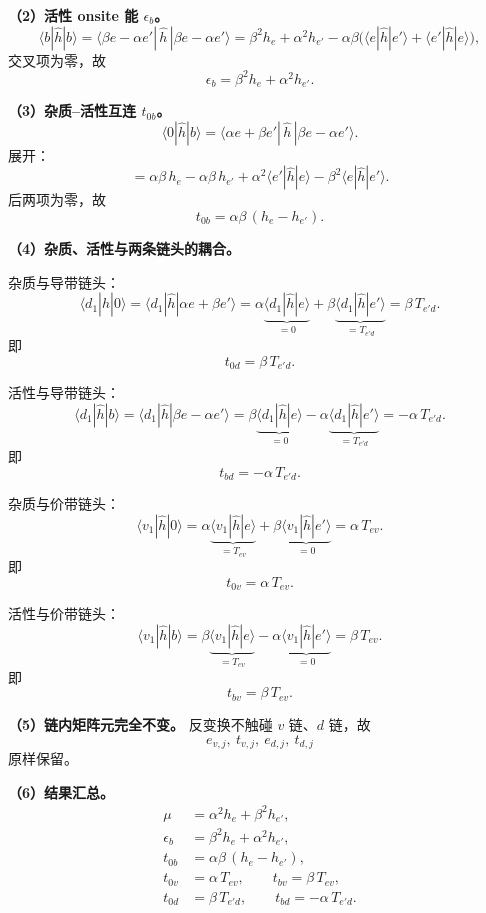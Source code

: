 \documentclass[11pt]{ctexart}
\begin{document}
\textbf{（2）活性 onsite 能 $\epsilon_b$。}
\[
\langle b|\hat h|b\rangle
=
\langle \beta e-\alpha e'|\,\hat h\,|\beta e-\alpha e'\rangle
=
\beta^2 h_e+\alpha^2 h_{e'}
-\alpha\beta\Big(\langle e|\hat h|e'\rangle+\langle e'|\hat h|e\rangle\Big) ,
\]
交叉项为零，故
\[
\epsilon_b=\beta^2 h_e+\alpha^2 h_{e'} .
\]

\textbf{（3）杂质--活性互连 $t_{0b}$。}
\[
\langle0|\hat h|b\rangle
=
\langle \alpha e+\beta e'|\,\hat h\,|\beta e-\alpha e'\rangle .
\]
展开：
\[
=
\alpha\beta\,h_e-\alpha\beta\,h_{e'}
+\alpha^2\langle e'|\hat h|e\rangle-\beta^2\langle e|\hat h|e'\rangle .
\]
后两项为零，故
\[
t_{0b}=\alpha\beta\,(h_e-h_{e'}) .
\]

\textbf{（4）杂质、活性与两条链头的耦合。}

杂质与导带链头：
\[
\langle d_1|\hat h|0\rangle
=
\langle d_1|\hat h|\alpha e+\beta e'\rangle
=
\alpha\underbrace{\langle d_1|\hat h|e\rangle}_{=0}
+\beta\underbrace{\langle d_1|\hat h|e'\rangle}_{=T_{e'd}}
=
\beta\,T_{e'd} .
\]
即
\[
t_{0d}=\beta\,T_{e'd} .
\]

活性与导带链头：
\[
\langle d_1|\hat h|b\rangle
=
\langle d_1|\hat h|\beta e-\alpha e'\rangle
=
\beta\underbrace{\langle d_1|\hat h|e\rangle}_{=0}
-\alpha\underbrace{\langle d_1|\hat h|e'\rangle}_{=T_{e'd}}
=
-\alpha\,T_{e'd} .
\]
即
\[
t_{bd}=-\alpha\,T_{e'd} .
\]

杂质与价带链头：
\[
\langle v_1|\hat h|0\rangle
=
\alpha\underbrace{\langle v_1|\hat h|e\rangle}_{=T_{ev}}
+\beta\underbrace{\langle v_1|\hat h|e'\rangle}_{=0}
=
\alpha\,T_{ev} .
\]
即
\[
t_{0v}=\alpha\,T_{ev} .
\]

活性与价带链头：
\[
\langle v_1|\hat h|b\rangle
=
\beta\underbrace{\langle v_1|\hat h|e\rangle}_{=T_{ev}}
-\alpha\underbrace{\langle v_1|\hat h|e'\rangle}_{=0}
=
\beta\,T_{ev} .
\]
即
\[
t_{bv}=\beta\,T_{ev} .
\]

\textbf{（5）链内矩阵元完全不变。}
反变换不触碰 $v$ 链、$d$ 链，故
\[
e_{v,j},\ t_{v,j},\ e_{d,j},\ t_{d,j}
\]
原样保留。

\textbf{（6）结果汇总。}
\[
\boxed{\;
\begin{aligned}
\mu&=\alpha^2 h_e+\beta^2 h_{e'} ,\\
\epsilon_b&=\beta^2 h_e+\alpha^2 h_{e'} ,\\
t_{0b}&=\alpha\beta\,(h_e-h_{e'}) ,\\
t_{0v}&=\alpha\,T_{ev},\qquad t_{bv}=\beta\,T_{ev} ,\\
t_{0d}&=\beta\,T_{e'd},\qquad t_{bd}=-\alpha\,T_{e'd} .
\end{aligned}\;}
\]
\end{document}
